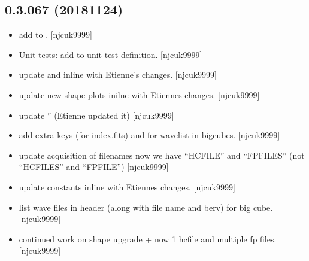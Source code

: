 \documentclass[a4paper,10pt,english]{report}
\begin{document}
\subsection{0.3.067 (2018\sphinxhyphen{}11\sphinxhyphen{}24)}
\label{\detokenize{misc/changelog:id274}}\begin{itemize}
\item {} 
 \sphinxhyphen{} add  to . {[}njcuk9999{]}

\item {} 
Unit tests: add  to unit test definition. {[}njcuk9999{]}

\item {} 
 \sphinxhyphen{} update  and  in\sphinxhyphen{}line with
Etienne’s changes. {[}njcuk9999{]}

\item {} 
 \sphinxhyphen{} update new shape plots in\sphinxhyphen{}ilne with Etiennes changes.
{[}njcuk9999{]}

\item {} 
 \sphinxhyphen{} update ” (Etienne updated it) {[}njcuk9999{]}

\item {} 
 \sphinxhyphen{} add extra keys (for index.fits) and for wave\sphinxhyphen{}list
in bigcubes. {[}njcuk9999{]}

\item {} 
 \sphinxhyphen{} update acquisition of filenames now we have “HCFILE”
and “FPFILES” (not “HCFILES” and “FPFILE”) {[}njcuk9999{]}

\item {} 
 \sphinxhyphen{} update constants inline with Etiennes
changes. {[}njcuk9999{]}

\item {} 
 \sphinxhyphen{} list wave files in header (along with file
name and berv) for big cube. {[}njcuk9999{]}

\item {} 
 \sphinxhyphen{} continued work on shape upgrade + now 1 hcfile
and multiple fp files. {[}njcuk9999{]}

\end{itemize}
\end{document}
